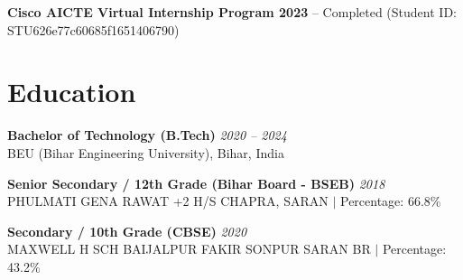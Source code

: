 \documentclass[11pt,a4paper]{article}
\begin{document}
\vspace{3pt}
\textbf{Cisco AICTE Virtual Internship Program 2023} -- Completed (Student ID: STU626e77c60685f1651406790)

\section{Education}
\textbf{Bachelor of Technology (B.Tech)} \hfill \textit{2020 -- 2024} \\
BEU (Bihar Engineering University), Bihar, India

\vspace{4pt}
\textbf{Senior Secondary / 12th Grade (Bihar Board - BSEB)} \hfill \textit{2018} \\
PHULMATI GENA RAWAT +2 H/S CHAPRA, SARAN $|$ Percentage: 66.8\%

\vspace{4pt}
\textbf{Secondary / 10th Grade (CBSE)} \hfill \textit{2020} \\
MAXWELL H SCH BAIJALPUR FAKIR SONPUR SARAN BR $|$ Percentage: 43.2\%
\end{document}
